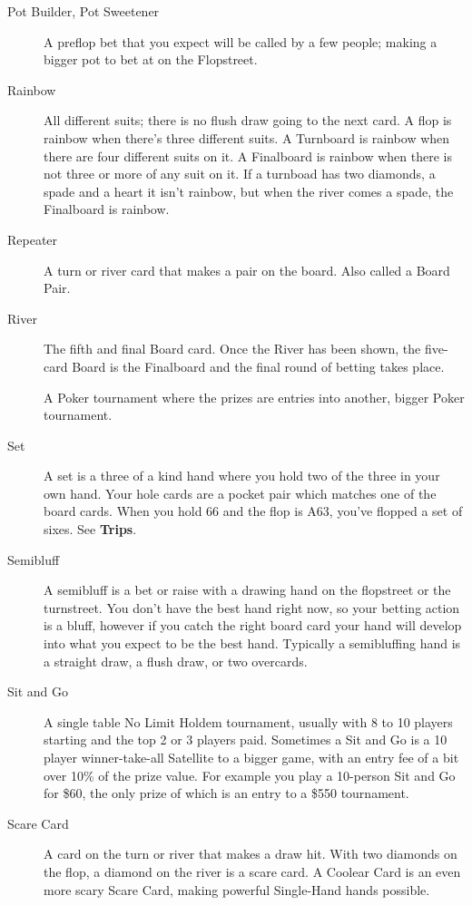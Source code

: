 \begin{description}
\item[Pot Builder, Pot Sweetener] A preflop bet that you expect will
be called by a few people; making a bigger pot to bet at on the
Flopstreet.

\item[Rainbow] All different suits; there is no flush
draw going to the next card. A flop is rainbow when there's three
different suits. A Turnboard is rainbow when there are four different
suits on it. A Finalboard is rainbow when there is not
three or more of any suit on it. If a turnboad has two diamonds, a
spade and a heart it isn't rainbow, but when the river comes a spade,
the Finalboard is rainbow.

\item[Repeater] A turn or river card that makes a pair on the
board. Also called a Board Pair.

\item[River] The fifth and final Board card. Once the River has been
shown, the five-card Board is the Finalboard and the final round of
betting takes place.

\tem[Satellite] A Poker tournament where the prizes are entries into
another, bigger Poker tournament.

\item[Set] A set is a three of a kind hand where you hold two of the
three in your own hand. Your hole cards are a pocket pair which
matches one of the board cards. When you hold 66 and the flop is A63,
you've flopped a set of sixes. See \textbf{Trips}.

\item[Semibluff] A semibluff is a bet or raise with a drawing hand on
the flopstreet or the turnstreet. You don't have the best hand right
now, so your betting action is a bluff, however if you catch the right
board card your hand will develop into what you expect to be the best
hand. Typically a semibluffing hand is a straight draw, a flush draw,
or two overcards.

\item[Sit and Go] A single table No Limit Holdem tournament, usually
with 8 to 10 players starting and the top 2 or 3 players
paid. Sometimes a Sit and Go is a 10 player winner-take-all
Satellite to a bigger game, with an entry fee of a
bit over 10\% of the prize value. For example you play a 10-person
Sit and Go for \$60, the only prize of which is an entry to a \$550
tournament.

\item[Scare Card] A card on the turn or river that makes a draw hit.
With two diamonds on the flop, a diamond on the river is a scare card.
A Coolear Card is an even more scary Scare Card, making powerful
Single-Hand hands possible.


\end{description}
